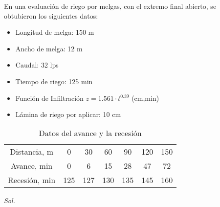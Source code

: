 \begin{example}
    En una evaluación de riego por melgas, con el extremo final abierto, se obtubieron los siguientes datos:
    \begin{itemize}
        \item Longitud de melga: 150 m
        \item Ancho de melga: 12 m
        \item Caudal: 32 lps
        \item Tiempo de riego: 125 min
        \item Función de Infiltración $z= 1.561\cdot t^{0.39}$ (cm,min)
        \item Lámina de riego por aplicar: 10 cm
    \end{itemize}
    \begin{table}[h!]
        \centering
        \begin{tabular}{@{}c|cccccc@{}}
        \toprule
        Distancia, m  & 0   & 30  & 60  & 90  & 120 & 150 \\
        Avance, min   & 0   & 6   & 15  & 28  & 47  & 72  \\
        Recesión, min & 125 & 127 & 130 & 135 & 145 & 160 \\ \bottomrule
        \end{tabular}
        \caption{Datos del avance y la recesión}
        \label{tabrg}
    \end{table}
    \textit{ Sol. }


\end{example}
